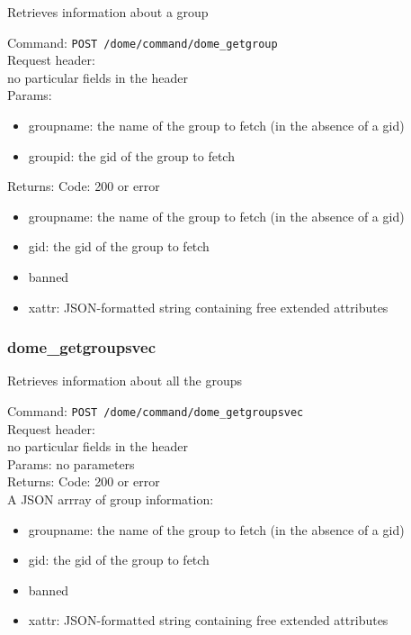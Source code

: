 \documentclass[a4paper,10pt]{scrreprt}
\begin{document}
Retrieves information about a group

Command:
\lstinline"POST /dome/command/dome_getgroup"\\

Request header:\\
no particular fields in the header\\

Params:
\begin{itemize}
 \item groupname: the name of the group to fetch (in the absence of a gid)
 \item groupid: the gid of the group to fetch
\end{itemize}

Returns:
Code: 200 or error
\begin{itemize}
 \item groupname: the name of the group to fetch (in the absence of a gid)
 \item gid: the gid of the group to fetch
 \item banned
 \item xattr: JSON-formatted string containing free extended attributes
\end{itemize}



\subsubsection{dome\_getgroupsvec}

Retrieves information about all the groups

Command:
\lstinline"POST /dome/command/dome_getgroupsvec"\\

Request header:\\
no particular fields in the header\\

Params:
no parameters\\

Returns:
Code: 200 or error\\
A JSON arrray of group information:\\
\begin{itemize}
 \item groupname: the name of the group to fetch (in the absence of a gid)
 \item gid: the gid of the group to fetch
 \item banned
 \item xattr: JSON-formatted string containing free extended attributes
\end{itemize}
\end{document}

